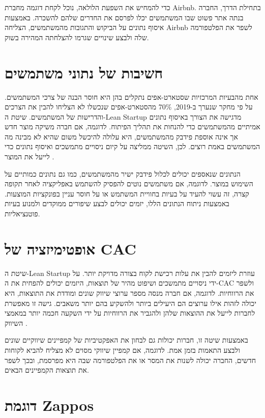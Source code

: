 כדי להמחיש את השפעת הלולאה, נוכל לקחת דוגמה מחברת Airbnb. בתחילת הדרך, החברה בנתה אתר פשוט שבו המשתמשים יכלו לפרסם את החדרים שלהם להשכרה. באמצעות איסוף נתונים על הביקוש והתגובות מהמשתמשים, הצליחה Airbnb לשפר את הפלטפורמה שלה ולבצע שינויים שגרמו להצלחתה המהירה בשוק.

\section{חשיבות של נתוני משתמשים}

אחת מהבעיות המרכזיות שסטארט-אפים נתקלים בהן היא חוסר הבנה של צרכי המשתמשים. על פי מחקר שנערך ב-2019, 70\% מהסטארט-אפים שנכשלו לא הצליחו להבין את הצרכים והדרישות של המשתמשים. שיטת ה-Lean Startup מדגישה את הצורך באיסוף נתונים אמיתיים מהמשתמשים כדי להנחות את תהליך הפיתוח. לדוגמה, אם חברה משיקה מוצר חדש אך אינה אוספת פידבק מהמשתמשים, היא עלולה להיכשל משום שהיא לא מבינה מה המשתמשים באמת רוצים. לכן, השיטה ממליצה על קיום ניסויים מתמשכים ואיסוף נתונים כדי לייעל את המוצר \cite{morris2019failure}.

הנתונים שנאספים יכולים לכלול פידבק ישיר מהמשתמשים, כמו גם נתונים כמותיים על השימוש במוצר. לדוגמה, אם משתמשים נוטים להפסיק להשתמש באפליקציה לאחר תקופה קצרה, זה עשוי להעיד על בעיות בחוויית המשתמש או על חוסר עניין בפונקציות המוצעות. באמצעות ניתוח הנתונים הללו, יזמים יכולים לבצע שיפורים ממוקדים ולמנוע בעיות פוטנציאליות.

\section{אופטימיזציה של CAC}

שיטת ה-Lean Startup עוזרת ליזמים להבין את עלות רכישת לקוח  בצורה מדויקת יותר. על ידי ניסויים מתמשכים ושיפוט מהיר של תוצאות, היזמים יכולים להפחית את ה-CAC ולשפר את הרווחיות. לדוגמה, אם חברה מנסה מספר ערוצי שיווק שונים ומודדת את התוצאות, היא יכולה לזהות אילו ערוצים הם היעילים ביותר ולהשקיע בהם יותר משאבים. גישה זו מאפשרת לחברות לייעל את ההוצאות שלהן ולהגביר את הרווחיות על ידי השקעה חכמה יותר במאמצי השיווק \cite{ries2011lean}.

באמצעות שיטה זו, חברות יכולות גם לבחון את האפקטיביות של קמפיינים שיווקיים שונים ולבצע התאמות בזמן אמת. לדוגמה, אם קמפיין שיווקי מסוים לא מצליח להביא לקוחות חדשים, החברה יכולה לשנות את המסר או את הפלטפורמה שבה היא מפרסמת, ובכך לשפר את תוצאות הקמפיינים הבאים.

\section{דוגמת Zappos}


